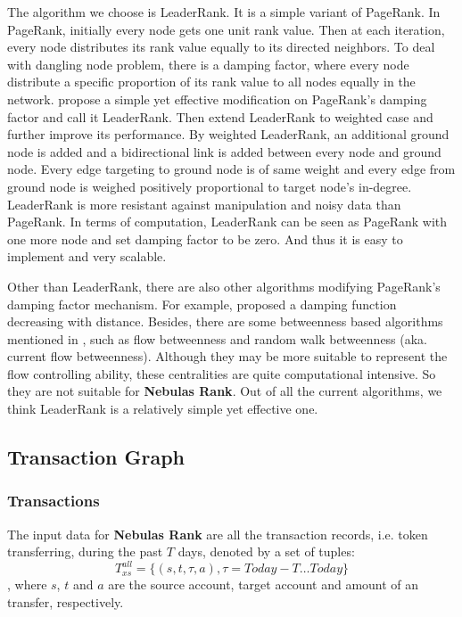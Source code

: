 The algorithm we choose is LeaderRank\cite{Chen2013}\cite{Li2014}. It is a simple variant of PageRank\cite{Brin2010}\cite{page1999pagerank}. In PageRank, initially every node gets one unit rank value. Then at each iteration, every node distributes its rank value equally to its directed neighbors. To deal with dangling node problem, there is a damping factor, where every node distribute a specific proportion of its rank value to all nodes equally in the network. \textcite{Chen2013} propose a simple yet effective modification on PageRank's damping factor and call it LeaderRank. Then \textcite{Li2014} extend LeaderRank to weighted case and further improve its performance. By weighted LeaderRank\cite{Li2014}, an additional ground node is added and a bidirectional link is added between every node and ground node. Every edge targeting to ground node is of same weight and every edge from ground node is weighed positively proportional to target node's in-degree. LeaderRank is more resistant against manipulation and noisy data than PageRank\cite{Chen2013}\cite{Li2014}\cite{Lu2016}. In terms of computation, LeaderRank can be seen as PageRank with one more node and set damping factor to be zero. And thus it is easy to implement and very scalable. 

Other than LeaderRank, there are also other algorithms modifying PageRank's damping factor mechanism. For example, \textcite{Baeza-Yates2006} proposed a damping function decreasing with distance. Besides, there are some betweenness based algorithms mentioned in \cite{Borgatti2005}, such as flow betweenness\cite{freeman1991centrality} and random walk betweenness (aka. current flow betweenness)\cite{newman2005measure}. Although they may be more suitable to represent the flow controlling ability, these centralities are quite computational intensive. So they are not suitable for \textbf{Nebulas Rank}. Out of all the current algorithms, we think LeaderRank is a relatively simple yet effective one.

\subsection{Transaction Graph} \label{sec:txg}

\subsubsection{Transactions}\label{subsec:transfer}
The input data for \textbf{Nebulas Rank} are all the transaction records, i.e. token transferring, during the past $T$ days, denoted by a set of tuples:
$$
	T_{xs}^{all} = \{(s,t,\tau, a), \tau = Today-T \dots Today \}
$$
, where $s$, $t$ and $a$ are the source account, target account and amount of an transfer, respectively.

